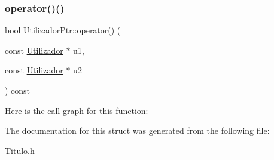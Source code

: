 \subsubsection{\texorpdfstring{operator()()}{operator()()}\hspace{0.1cm}{\footnotesize\ttfamily [2/2]}}
{\footnotesize\ttfamily bool Utilizador\+Ptr\+::operator() (\begin{DoxyParamCaption}\item[{const \mbox{\hyperlink{class_utilizador}{Utilizador}} $\ast$}]{u1,  }\item[{const \mbox{\hyperlink{class_utilizador}{Utilizador}} $\ast$}]{u2 }\end{DoxyParamCaption}) const\hspace{0.3cm}{\ttfamily [inline]}}

Here is the call graph for this function\+:


The documentation for this struct was generated from the following file\+:\begin{DoxyCompactItemize}
\item 
\mbox{\hyperlink{_titulo_8h}{Titulo.\+h}}\end{DoxyCompactItemize}
